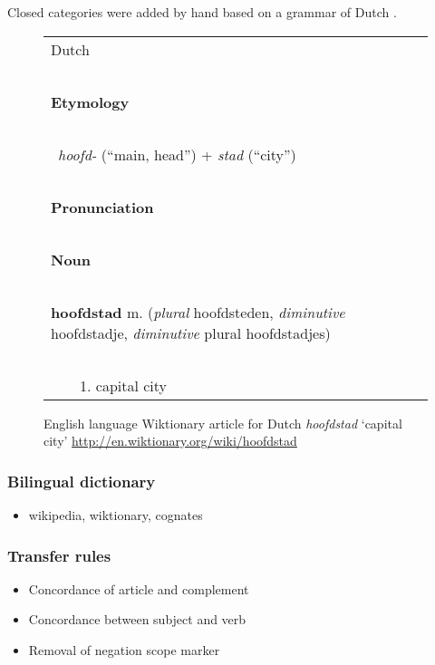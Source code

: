 \documentclass[11pt]{article}
\begin{document}
Closed categories were added by hand based on a grammar of Dutch \cite{Shetter:02}.

\begin{figure*}
\centering
\begin{small}
\begin{tabular}{|l|}
\hline
{\large Dutch} \\
~\\
{\bf Etymology}\\
~\\
~{\em hoofd-} (``main, head'') + {\em stad} (``city'')\\
~\\
{\bf Pronunciation}\\
~\\
{\bf Noun}\\
~\\
{\bf hoofdstad} m. ({\em plural} hoofdsteden, {\em diminutive} hoofdstadje, {\em diminutive} plural hoofdstadjes) \\
~\\
~~~~1. capital city \\

\hline
\end{tabular}
\end{small}
\caption{English language Wiktionary article for Dutch \emph{hoofdstad} `capital city' 
    {\small \url{http://en.wiktionary.org/wiki/hoofdstad}}}
\label{fig:wikt1}
\end{figure*}

\subsubsection{Bilingual dictionary}

\begin{itemize}
\item wikipedia, wiktionary, cognates
\end{itemize}

\subsubsection{Transfer rules}


\begin{itemize}
\item Concordance of article and complement
\item Concordance between subject and verb
\item Removal of negation scope marker
\end{itemize}
\end{document}
